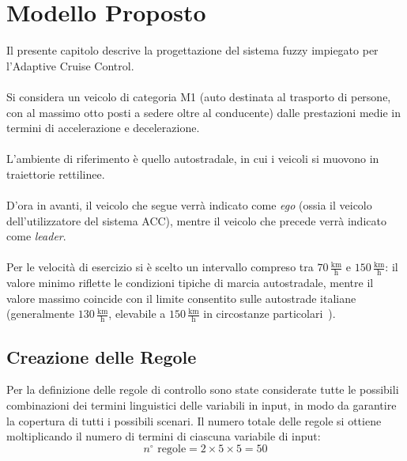 \chapter{Modello Proposto}

Il presente capitolo descrive la progettazione del sistema fuzzy impiegato per l'Adaptive Cruise Control.  
\\\\
Si considera un veicolo di categoria M1 (auto destinata al trasporto di persone, con al massimo otto posti a sedere oltre al conducente)
dalle prestazioni medie in termini di accelerazione e decelerazione.  
\\\\
L'ambiente di riferimento è quello autostradale, in cui i veicoli si muovono in traiettorie rettilinee.  
\\\\
D'ora in avanti, il veicolo che segue verrà indicato come \emph{ego} (ossia il veicolo dell'utilizzatore del sistema ACC), 
mentre il veicolo che precede verrà indicato come \emph{leader}.  
\\\\
Per le velocità di esercizio si è scelto un intervallo compreso tra \(70\,\text{$\frac{\mathrm{km}}{\mathrm{h}}$}\) e \(150\,\text{$\frac{\mathrm{km}}{\mathrm{h}}$}\): 
il valore minimo riflette le condizioni tipiche di marcia autostradale, mentre il valore massimo coincide con il limite consentito 
sulle autostrade italiane (generalmente \(130\,\text{$\frac{\mathrm{km}}{\mathrm{h}}$}\), elevabile a \(150\,\text{$\frac{\mathrm{km}}{\mathrm{h}}$}\) in circostanze particolari~\cite{limite_autostrada_150}).  
 



\section{Creazione delle Regole}
Per la definizione delle regole di controllo sono state considerate tutte le possibili combinazioni dei termini linguistici 
delle variabili in input, in modo da garantire la copertura di tutti i possibili scenari.  
Il numero totale delle regole si ottiene moltiplicando il numero di termini di ciascuna variabile di input:
\[
n^\circ \text{ regole} = 2 \times 5 \times 5 = 50
\]

